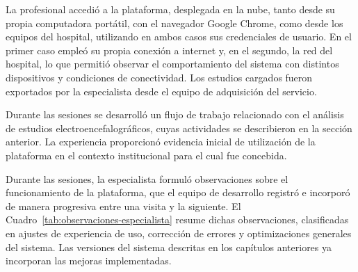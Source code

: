 La profesional accedió a la plataforma, desplegada en la nube, tanto desde su propia computadora portátil, con el navegador Google Chrome, como desde los equipos del hospital, utilizando en ambos casos sus credenciales de usuario.
En el primer caso empleó su propia conexión a internet y, en el segundo, la red del hospital, lo que permitió observar el comportamiento del sistema con distintos dispositivos y condiciones de conectividad.
Los estudios cargados fueron exportados por la especialista desde el equipo de adquisición del servicio.

Durante las sesiones se desarrolló un flujo de trabajo relacionado con el análisis de estudios electroencefalográficos, cuyas actividades se describieron en la sección anterior. La experiencia proporcionó evidencia inicial de utilización de la plataforma en el contexto institucional para el cual fue concebida.

Durante las sesiones, la especialista formuló observaciones sobre el funcionamiento de la plataforma, que el equipo de desarrollo registró e incorporó de manera progresiva entre una visita y la siguiente.
El Cuadro~\ref{tab:observaciones-especialista} resume dichas observaciones, clasificadas en ajustes de experiencia de uso, corrección de errores y optimizaciones generales del sistema.
Las versiones del sistema descritas en los capítulos anteriores ya incorporan las mejoras implementadas.

